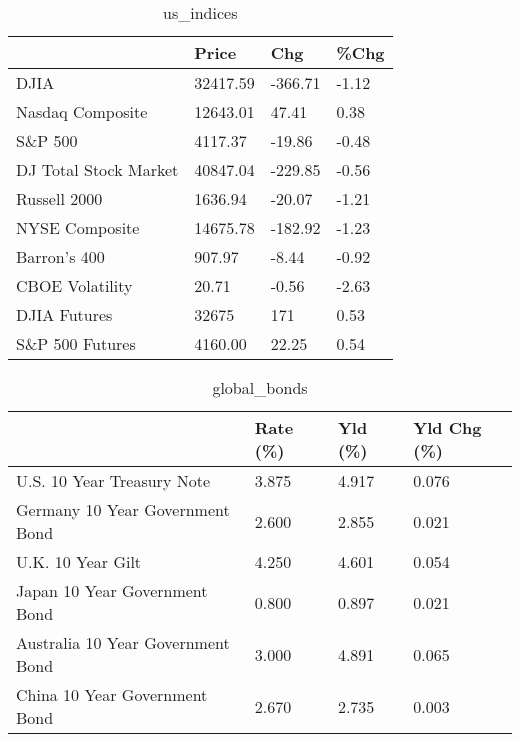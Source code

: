 \documentclass{article}%
\begin{document}
%


\begin{table}[htbp]%
\caption{us\_indices}%
\centering%
\begin{adjustbox}{width=1\textwidth}%
\begin{tabular}{llll}
\toprule
                      &    Price &     Chg &  \%Chg \\
\midrule
                 DJIA & 32417.59 & -366.71 & -1.12 \\
     Nasdaq Composite & 12643.01 &   47.41 &  0.38 \\
              S\&P 500 &  4117.37 &  -19.86 & -0.48 \\
DJ Total Stock Market & 40847.04 & -229.85 & -0.56 \\
         Russell 2000 &  1636.94 &  -20.07 & -1.21 \\
       NYSE Composite & 14675.78 & -182.92 & -1.23 \\
         Barron's 400 &   907.97 &   -8.44 & -0.92 \\
      CBOE Volatility &    20.71 &   -0.56 & -2.63 \\
         DJIA Futures &    32675 &     171 &  0.53 \\
      S\&P 500 Futures &  4160.00 &   22.25 &  0.54 \\
\bottomrule
\end{tabular}
%
\end{adjustbox}%
\end{table}

%


\begin{table}[htbp]%
\caption{global\_bonds}%
\centering%
\begin{adjustbox}{width=1\textwidth}%
\begin{tabular}{llll}
\toprule
                                  & Rate (\%) & Yld (\%) & Yld Chg (\%) \\
\midrule
       U.S. 10 Year Treasury Note &    3.875 &   4.917 &       0.076 \\
  Germany 10 Year Government Bond &    2.600 &   2.855 &       0.021 \\
                U.K. 10 Year Gilt &    4.250 &   4.601 &       0.054 \\
    Japan 10 Year Government Bond &    0.800 &   0.897 &       0.021 \\
Australia 10 Year Government Bond &    3.000 &   4.891 &       0.065 \\
    China 10 Year Government Bond &    2.670 &   2.735 &       0.003 \\
\bottomrule
\end{tabular}
%
\end{adjustbox}%
\end{table}
\end{document}
